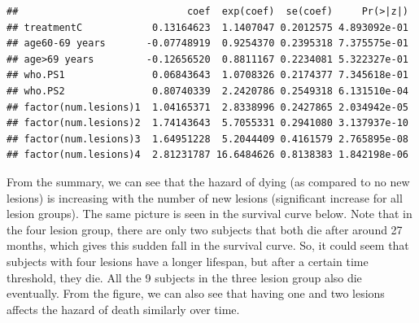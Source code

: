 \documentclass[
  11pt,
]{article}
\newenvironment{Shaded}{\begin{snugshade}}{\end{snugshade}}
\newcommand{\AttributeTok}[1]{\textcolor[rgb]{0.77,0.63,0.00}{#1}}
\newcommand{\DecValTok}[1]{\textcolor[rgb]{0.00,0.00,0.81}{#1}}
\newcommand{\FloatTok}[1]{\textcolor[rgb]{0.00,0.00,0.81}{#1}}
\newcommand{\FunctionTok}[1]{\textcolor[rgb]{0.00,0.00,0.00}{#1}}
\newcommand{\NormalTok}[1]{#1}
\newcommand{\OtherTok}[1]{\textcolor[rgb]{0.56,0.35,0.01}{#1}}
\newcommand{\SpecialCharTok}[1]{\textcolor[rgb]{0.00,0.00,0.00}{#1}}
\newcommand{\StringTok}[1]{\textcolor[rgb]{0.31,0.60,0.02}{#1}}
\begin{document}
\begin{Shaded}
\end{Shaded}

\begin{verbatim}
##                             coef  exp(coef)  se(coef)     Pr(>|z|)
## treatmentC            0.13164623  1.1407047 0.2012575 4.893092e-01
## age60-69 years       -0.07748919  0.9254370 0.2395318 7.375575e-01
## age>69 years         -0.12656520  0.8811167 0.2234081 5.322327e-01
## who.PS1               0.06843643  1.0708326 0.2174377 7.345618e-01
## who.PS2               0.80740339  2.2420786 0.2549318 6.131510e-04
## factor(num.lesions)1  1.04165371  2.8338996 0.2427865 2.034942e-05
## factor(num.lesions)2  1.74143643  5.7055331 0.2941080 3.137937e-10
## factor(num.lesions)3  1.64951228  5.2044409 0.4161579 2.765895e-08
## factor(num.lesions)4  2.81231787 16.6484626 0.8138383 1.842198e-06
\end{verbatim}

From the summary, we can see that the hazard of dying (as compared to no
new lesions) is increasing with the number of new lesions (significant
increase for all lesion groups). The same picture is seen in the
survival curve below. Note that in the four lesion group, there are only
two subjects that both die after around 27 months, which gives this
sudden fall in the survival curve. So, it could seem that subjects with
four lesions have a longer lifespan, but after a certain time threshold,
they die. All the 9 subjects in the three lesion group also die
eventually. From the figure, we can also see that having one and two
lesions affects the hazard of death similarly over time.
\end{document}
